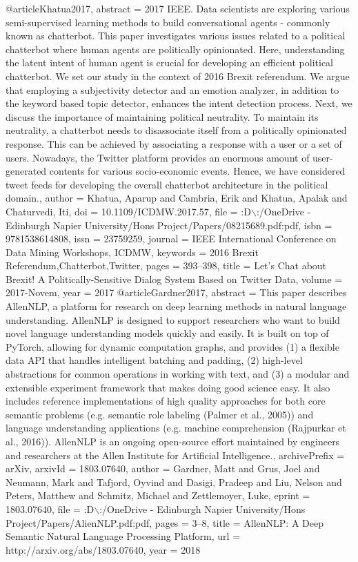 @article{Khatua2017,
      abstract = {{\textcopyright} 2017 IEEE. Data scientists are exploring various semi-supervised learning methods to build conversational agents - commonly known as chatterbot. This paper investigates various issues related to a political chatterbot where human agents are politically opinionated. Here, understanding the latent intent of human agent is crucial for developing an efficient political chatterbot. We set our study in the context of 2016 Brexit referendum. We argue that employing a subjectivity detector and an emotion analyzer, in addition to the keyword based topic detector, enhances the intent detection process. Next, we discuss the importance of maintaining political neutrality. To maintain its neutrality, a chatterbot needs to disassociate itself from a politically opinionated response. This can be achieved by associating a response with a user or a set of users. Nowadays, the Twitter platform provides an enormous amount of user-generated contents for various socio-economic events. Hence, we have considered tweet feeds for developing the overall chatterbot architecture in the political domain.},
      author = {Khatua, Aparup and Cambria, Erik and Khatua, Apalak and Chaturvedi, Iti},
      doi = {10.1109/ICDMW.2017.57},
      file = {:D$\backslash$:/OneDrive - Edinburgh Napier University/Hons Project/Papers/08215689.pdf:pdf},
      isbn = {9781538614808},
      issn = {23759259},
      journal = {IEEE International Conference on Data Mining Workshops, ICDMW},
      keywords = {2016 Brexit Referendum,Chatterbot,Twitter},
      pages = {393--398},
      title = {{Let's Chat about Brexit! A Politically-Sensitive Dialog System Based on Twitter Data}},
      volume = {2017-Novem},
      year = {2017}
}
@article{Gardner2017,
      abstract = {This paper describes AllenNLP, a platform for research on deep learning methods in natural language understanding. AllenNLP is designed to support researchers who want to build novel language understanding models quickly and easily. It is built on top of PyTorch, allowing for dynamic computation graphs, and provides (1) a flexible data API that handles intelligent batching and padding, (2) high-level abstractions for common operations in working with text, and (3) a modular and extensible experiment framework that makes doing good science easy. It also includes reference implementations of high quality approaches for both core semantic problems (e.g. semantic role labeling (Palmer et al., 2005)) and language understanding applications (e.g. machine comprehension (Rajpurkar et al., 2016)). AllenNLP is an ongoing open-source effort maintained by engineers and researchers at the Allen Institute for Artificial Intelligence.},
      archivePrefix = {arXiv},
      arxivId = {1803.07640},
      author = {Gardner, Matt and Grus, Joel and Neumann, Mark and Tafjord, Oyvind and Dasigi, Pradeep and Liu, Nelson and Peters, Matthew and Schmitz, Michael and Zettlemoyer, Luke},
      eprint = {1803.07640},
      file = {:D$\backslash$:/OneDrive - Edinburgh Napier University/Hons Project/Papers/AlienNLP.pdf:pdf},
      pages = {3--8},
      title = {{AllenNLP: A Deep Semantic Natural Language Processing Platform}},
      url = {http://arxiv.org/abs/1803.07640},
      year = {2018}
}
